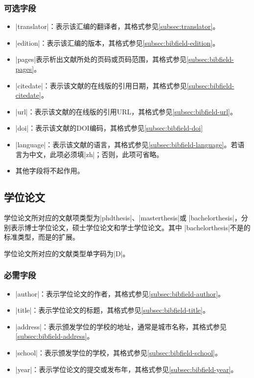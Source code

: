 \subsubsection{可选字段}

\begin{itemize}
\item |translator|：表示该汇编的翻译者，其格式参见\ref{subsec:translator}。
\item |edition|：表示该汇编的版本，其格式参见\ref{subsec:bibfield-edition}。
\item |pages|表示析出文献所处的页码或页码范围，其格式参见\ref{subsec:bibfield-pages}。
\item |citedate|：表示该文献的在线版的引用日期，其格式参见\ref{subsec:bibfield-citedate}。
\item |url|：表示该文献的在线版的引用URL，其格式参见\ref{subsec:bibfield-url}。
\item |doi|：表示该文献的DOI编码，其格式参见\ref{subsec:bibfield-doi}
\item |language|：表示该文献的语言，其格式参见\ref{subsec:bibfield-language}。若语
  言为中文，此项必须填|zh|；否则，此项可省略。
\item 其他字段将不起作用。
\end{itemize}

\subsection{学位论文}\label{subsec:bibtype-thesis}

学位论文所对应的{\BibTeX}文献项类型为|phdthesis|、|masterthesis|或
|bachelorthesis|，分别表示博士学位论文，硕士学位论文和学士学位论文。其中
|bachelorthesis|不是{\BibTeX}的标准类型，而是{\njuthesis}的扩展。

学位论文所对应的文献类型\cite{gbt3469-1983}单字码为|D|。

\subsubsection{必需字段}

\begin{itemize}
\item |author|：表示学位论文的作者，其格式参见\ref{subsec:bibfield-author}。
\item |title|：表示学位论文的标题，其格式参见\ref{subsec:bibfield-title}。
\item |address|：表示颁发学位的学校的地址，通常是城市名称，其格式参见\ref{subsec:bibfield-address}。
\item |school|：表示颁发学位的学校，其格式参见\ref{subsec:bibfield-school}。
\item |year|：表示学位论文的提交或发布年，其格式参见\ref{subsec:bibfield-year}。
\end{itemize}

